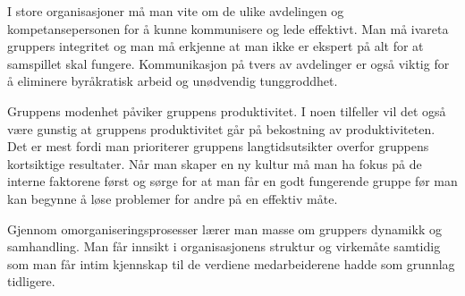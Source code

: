 \documentclass[12pt, a4paper]{article}
\begin{document}
I store organisasjoner må man vite om de ulike avdelingen og kompetansepersonen
for å kunne kommunisere og lede effektivt. Man må ivareta gruppers integritet
og man må erkjenne at man ikke er ekspert på alt for at samspillet skal
fungere. Kommunikasjon på tvers av avdelinger er også viktig for å eliminere
byråkratisk arbeid og unødvendig tunggroddhet.  

Gruppens modenhet påviker gruppens produktivitet. I noen tilfeller vil det også
være gunstig at gruppens produktivitet går på bekostning av produktiviteten.
Det er mest fordi man prioriterer gruppens langtidsutsikter overfor gruppens
kortsiktige resultater. Når man skaper en ny kultur må man ha fokus på de
interne faktorene først og sørge for at man får en godt fungerende gruppe før
man kan begynne å løse problemer for andre på en effektiv måte.  

Gjennom omorganiseringsprosesser lærer man masse om gruppers dynamikk og
samhandling. Man får innsikt i organisasjonens struktur og virkemåte samtidig
som man får intim kjennskap til de verdiene medarbeiderene hadde som grunnlag
tidligere. 



\end{document}
